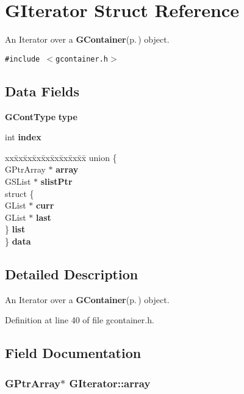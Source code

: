 \section{GIterator Struct Reference}
\label{structGIterator}
An Iterator over a {\bf GContainer}{\rm (p.\,\pageref{structGContainer})} object.  


{\tt \#include $<$gcontainer.h$>$}

\subsection*{Data Fields}
\begin{CompactItemize}
\item 
{\bf GCont\-Type} {\bf type}
\item 
int {\bf index}
\item 
\begin{tabbing}
xx\=xx\=xx\=xx\=xx\=xx\=xx\=xx\=xx\=\kill
union \{\\
\>GPtrArray $\ast$ {\bf array}\\
\>GSList $\ast$ {\bf slistPtr}\\
\>struct \{\\
\>\>GList $\ast$ {\bf curr}\\
\>\>GList $\ast$ {\bf last}\\
\>\} {\bf list}\\
\} {\bf data}\\

\end{tabbing}\end{CompactItemize}


\subsection{Detailed Description}
An Iterator over a {\bf GContainer}{\rm (p.\,\pageref{structGContainer})} object. 



Definition at line 40 of file gcontainer.h.

\subsection{Field Documentation}
\subsubsection{\setlength{\rightskip}{0pt plus 5cm}GPtr\-Array$\ast$ {\bf GIterator::array}}\label{structGIterator_o2}





